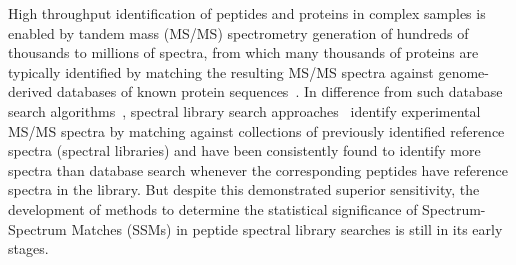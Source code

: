 \documentclass[endnotes,11pt]{article}
\begin{document}
\newpage



High throughput identification of peptides and proteins in complex samples is enabled by tandem mass (MS/MS) spectrometry generation of hundreds of thousands to millions of spectra, from which many thousands of proteins are typically identified by matching the resulting MS/MS spectra against genome-derived databases of known protein sequences~\cite{aebersold03}. In difference from such database search algorithms~\cite{eng94,mascot02,kim10cidetd}, spectral library search approaches~\cite{yates98,stein99,craig06,frewen06,lam07,wang10,yen11,dasari12} identify experimental MS/MS spectra by matching against collections of previously identified reference spectra (spectral libraries) and have been consistently found to identify more spectra than database search whenever the corresponding peptides have reference spectra in the library. But despite this demonstrated superior sensitivity, the development of methods to determine the statistical significance of Spectrum-Spectrum Matches (SSMs) in peptide spectral library searches is still in its early stages.
\end{document}
